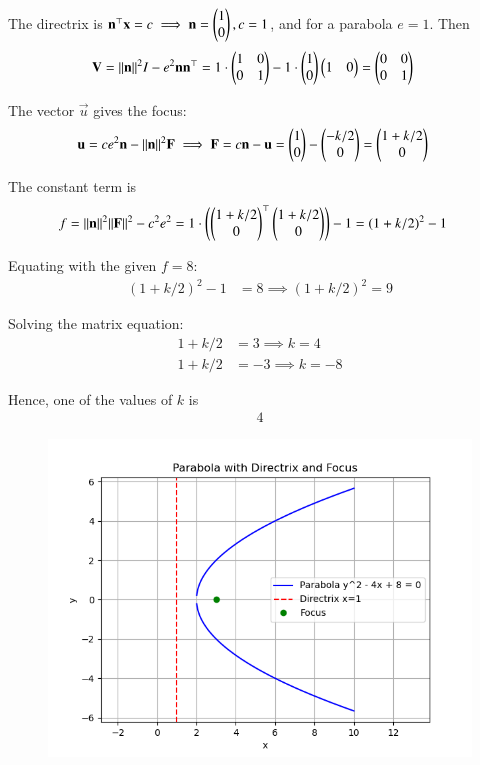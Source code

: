 \documentclass[journal]{IEEEtran}
\begin{document}
The directrix is \(\mathbf{n}^\top \mathbf{x} = c \implies \mathbf{n} = \begin{pmatrix}1 \\ 0\end{pmatrix}, c = 1\), and for a parabola \(e = 1\). Then
\begin{align}
\mathbf{V} &= \|\mathbf{n}\|^2 I - e^2 \mathbf{n} \mathbf{n}^\top 
= 1 \cdot \begin{pmatrix}1 & 0 \\ 0 & 1\end{pmatrix} - 1 \cdot \begin{pmatrix}1\\0\end{pmatrix} \begin{pmatrix}1 & 0\end{pmatrix} 
= \begin{pmatrix}0 & 0 \\ 0 & 1\end{pmatrix}
\end{align}

The vector \(\vec{u}\) gives the focus:
\begin{align}
\mathbf{u} &= c e^2 \mathbf{n} - \|\mathbf{n}\|^2 \mathbf{F} \implies
\mathbf{F} = c \mathbf{n} - \mathbf{u} = \begin{pmatrix}1 \\ 0\end{pmatrix} - \begin{pmatrix}-k/2 \\ 0\end{pmatrix} = \begin{pmatrix}1 + k/2 \\ 0\end{pmatrix}
\end{align}

The constant term is
\begin{align}
f &= \|\mathbf{n}\|^2 \|\mathbf{F}\|^2 - c^2 e^2 
= 1 \cdot \left( \begin{pmatrix}1 + k/2 \\ 0\end{pmatrix}^\top \begin{pmatrix}1 + k/2 \\ 0\end{pmatrix} \right) - 1 
= (1 + k/2)^2 - 1
\end{align}

Equating with the given \(f = 8\):
\begin{align}
(1 + k/2)^2 - 1 &= 8 \implies (1 + k/2)^2 = 9
\end{align}

Solving the matrix equation:
\begin{align}
1 + k/2 &= 3 \implies k = 4 \\
1 + k/2 &= -3 \implies k = -8
\end{align}

Hence, one of the values of \(k\) is
\begin{align}
\boxed{4}
\end{align}
\begin{figure}[H]
    \centering
    \includegraphics[width=0.8\linewidth]{Figs/Fig1.png}
    \caption{}
    \label{fig:placeholder}
\end{figure}
\end{document}
